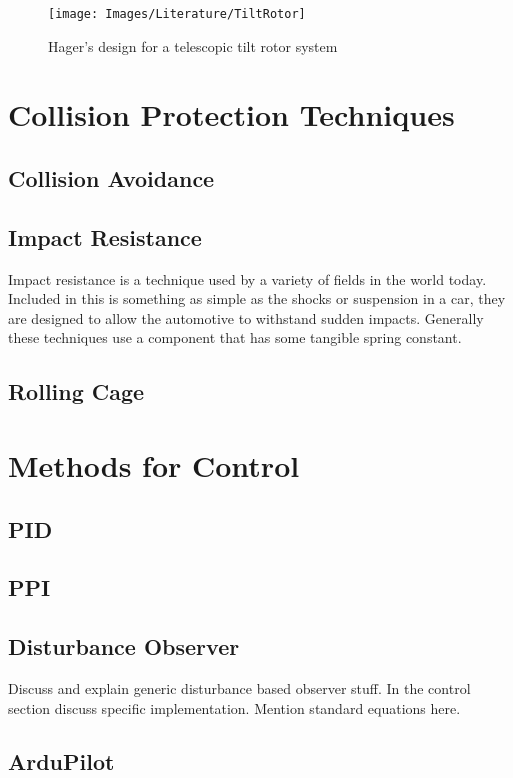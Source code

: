 \begin{figure}[H]
\centering
\texttt{[image: Images/Literature/TiltRotor]}     
\caption{Hager's design for a telescopic tilt rotor system \cite{Heli}}
\label{IM_TiltRotor}
\end{figure}

\section{Collision Protection Techniques}
\cite{Klaptocz2013, Collision, Klaptocz2012, Briod2012, Daler2013, Klaptocz2010}
\subsection{Collision Avoidance}
\subsection{Impact Resistance}
Impact resistance is a technique used by a variety of fields in the world today. Included in this is something as simple as the shocks or suspension in a car, they are designed to allow the automotive to withstand sudden impacts. Generally these techniques use a component that has some tangible spring constant.


\subsection{Rolling Cage}

\section{Methods for Control}

\subsection{PID}
\subsection{PPI}
\subsection{Disturbance Observer}\label{SectionDisturbanceObserver}
Discuss and explain generic disturbance based observer stuff. In the control section discuss specific implementation. Mention standard equations here. 

\subsection{ArduPilot}


